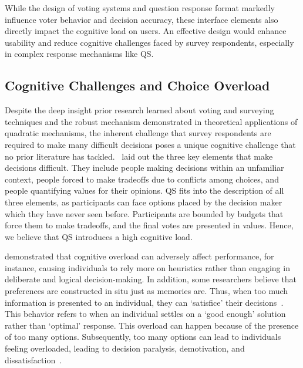 While the design of voting systems and question response format markedly influence voter behavior and decision accuracy, these interface elements also directly impact the cognitive load on users. An effective design would enhance usability and reduce cognitive challenges faced by survey respondents, especially in complex response mechanisms like QS.

\subsection{Cognitive Challenges and Choice Overload}
Despite the deep insight prior research learned about voting and surveying techniques and the robust mechanism demonstrated in theoretical applications of quadratic mechanisms, the inherent challenge that survey respondents are required to make many difficult decisions poses a unique cognitive challenge that no prior literature has tackled.~\textcite{lichtensteinConstructionPreference2006} laid out the three key elements that make decisions difficult. They include people making decisions within an unfamiliar context, people forced to make tradeoffs due to conflicts among choices, and people quantifying values for their opinions. QS fits into the description of all three elements, as participants can face options placed by the decision maker which they have never seen before. Participants are bounded by budgets that force them to make tradeoffs, and the final votes are presented in values. Hence, we believe that QS introduces a high cognitive load.

\textcite{daniel2017thinking} demonstrated that cognitive overload can adversely affect performance, for instance, causing individuals to rely more on heuristics rather than engaging in deliberate and logical decision-making. In addition, some researchers believe that preferences are constructed in situ just as memories are. Thus, when too much information is presented to an individual, they can `satisfice' their decisions~\cite{simonBehavioralModelRational1955, payneAdaptiveStrategySelection1988, tverskyJudgmentsRepresentativeness}. This behavior refers to when an individual settles on a `good enough' solution rather than `optimal' response. This overload can happen because of the presence of too many options. Subsequently, too many options can lead to individuals feeling overloaded, leading to decision paralysis, demotivation, and dissatisfaction~\cite{iyengarWhenChoiceDemotivating2000}.

